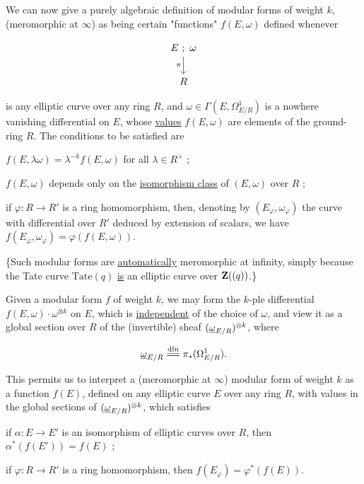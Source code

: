 
We can now give a purely algebraic definition of modular forms of weight $k$,
(meromorphic at $\infty$) as being certain "functions" $f(E,\omega)$ defined
whenever

\[
\begin{tikzcd}
E\ ;\ \omega \arrow[d, "\pi"'] \\
R
\end{tikzcd}
\]

is any elliptic curve over any ring $R$, and $\omega\in\Gamma(E,\Omega^1_{E/R})$
is a nowhere vanishing differential on $E$, whose \uline{values} $f(E,\omega)$
are elements of the ground-ring $R$. The conditions to be satisfied are

 $f(E,\lambda\omega)=\lambda^{-k}f(E,\omega)$ for all
$\lambda\in R^\times$ ;

 $f(E,\omega)$ depends only on the \uline{isomorphism class} of
$(E,\omega)$ over $R$ ;

 if $\varphi\colon R\to R'$ is a ring homomorphism, then, denoting by
$(E_\varphi,\omega_\varphi)$ the curve with differential over $R'$ deduced by
extension of scalars, we have $f(E_\varphi,\omega_\varphi)=\varphi(f(E,\omega))$.

\{Such modular forms are \uline{automatically} meromorphic at infinity, simply
because the Tate curve $\mathrm{Tate}(q)$ \uline{is} an elliptic curve over
$\mathbf{Z}((q))$.\}

Given a modular form $f$ of weight $k$, we may form the $k$-ple differential
$f(E,\omega)\cdot\omega^{\otimes k}$ on $E$, which is \uline{independent} of the
choice of $\omega$, and view it as a global section over $R$ of the (invertible)
sheaf $(\underline{\omega}_{E/R})^{\otimes k}$, where

\[
\w_{E/R} \xlongequal{\text{dfn}} \pi_*(\Omega^1_{E/R}) .
\]

This permits us to interpret a (meromorphic at $\infty$) modular form of weight
$k$ as a function $f(E)$, defined on any elliptic curve $E$ over any ring $R$,
with values in the global sections of $(\underline{\omega}_{E/R})^{\otimes k}$, which satisfies

 if $\alpha\colon E\to E'$ is an isomorphism of elliptic curves over
$R$, then $\alpha^*(f(E'))=f(E)$ ;

 if $\varphi\colon R\to R'$ is a ring homomorphism, then
$f(E_\varphi)=\varphi^*(f(E))$.

